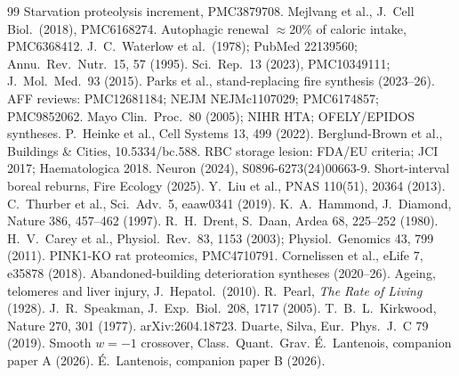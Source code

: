 \documentclass[11pt]{article}
\begin{document}
\begin{thebibliography}{99}\small
{} Starvation proteolysis increment, PMC3879708.  Mejlvang et al., J.\ Cell Biol.\ (2018), PMC6168274.
 Autophagic renewal $\approx$20\% of caloric intake, PMC6368412.  J.\ C.\ Waterlow et al.\ (1978); PubMed 22139560; Annu.\ Rev.\ Nutr.\ 15, 57 (1995).
 Sci.\ Rep.\ 13 (2023), PMC10349111; J.\ Mol.\ Med.\ 93 (2015).  Parks et al., stand-replacing fire synthesis (2023--26).
 AFF reviews: PMC12681184; NEJM NEJMc1107029; PMC6174857; PMC9852062.  Mayo Clin.\ Proc.\ 80 (2005); NIHR HTA; OFELY/EPIDOS syntheses.
 P.\ Heinke et al., Cell Systems 13, 499 (2022).  Berglund-Brown et al., Buildings \& Cities, 10.5334/bc.588.
 RBC storage lesion: FDA/EU criteria; JCI 2017; Haematologica 2018.  Neuron (2024), S0896-6273(24)00663-9.
 Short-interval boreal reburns, Fire Ecology (2025).  Y.\ Liu et al., PNAS 110(51), 20364 (2013).
 C.\ Thurber et al., Sci.\ Adv.\ 5, eaaw0341 (2019).  K.\ A.\ Hammond, J.\ Diamond, Nature 386, 457--462 (1997).
 R.\ H.\ Drent, S.\ Daan, Ardea 68, 225--252 (1980).  H.\ V.\ Carey et al., Physiol.\ Rev.\ 83, 1153 (2003); Physiol.\ Genomics 43, 799 (2011).
 PINK1-KO rat proteomics, PMC4710791.  Cornelissen et al., eLife 7, e35878 (2018).
 Abandoned-building deterioration syntheses (2020--26).  Ageing, telomeres and liver injury, J.\ Hepatol.\ (2010).
 R.\ Pearl, \emph{The Rate of Living} (1928).  J.\ R.\ Speakman, J.\ Exp.\ Biol.\ 208, 1717 (2005).
 T.\ B.\ L.\ Kirkwood, Nature 270, 301 (1977).  arXiv:2604.18723.
 Duarte, Silva, Eur.\ Phys.\ J.\ C 79 (2019).  Smooth $w=-1$ crossover, Class.\ Quant.\ Grav.
 \'E.\ Lantenois, companion paper A (2026).  \'E.\ Lantenois, companion paper B (2026).
\end{thebibliography}
\end{document}
